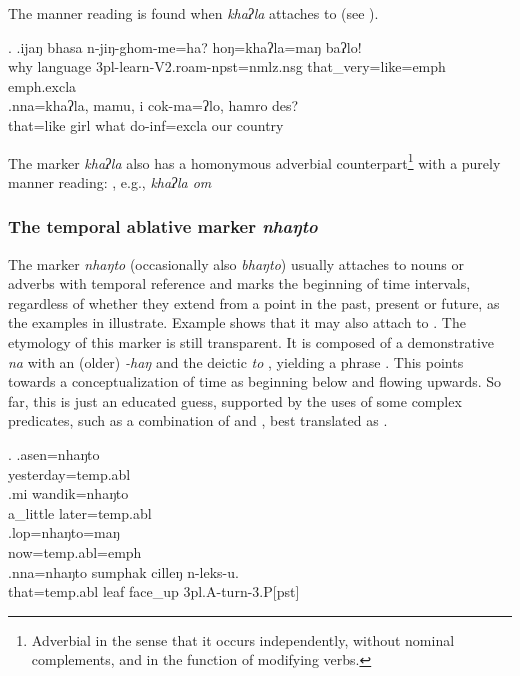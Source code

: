 \largerpage[2]
The manner reading is found when \emph{khaʔla}  attaches to  (see \Next).

\ex. \ag.ijaŋ bhasa    n-jiŋ-ghom-me=ha?                        hoŋ=khaʔla=maŋ baʔlo!\\
why language {\sc 3pl-}learn{\sc -V2.roam-npst=nmlz.nsg} that\_very=like{\sc =emph} {\sc emph.excla}\\
 
\bg.nna=khaʔla, mamu, i    cok-ma=ʔlo,               hamro des?\\
that=like girl what do{\sc -inf=excla} our country\\
 

The marker \emph{khaʔla} also has a homonymous adverbial counterpart\footnote{Adverbial in the sense that it occurs independently, without nominal complements, and in the function of  modifying verbs.} with a purely manner reading: , e.g.,  \emph{khaʔla om}  

\subsubsection{The temporal ablative marker \emph{nhaŋto} }
   
   The marker \emph{nhaŋto} (occasionally also \emph{bhaŋto}) usually attaches to nouns or adverbs with temporal reference and marks the beginning of time intervals, regardless of whether they extend from a point in the past, present or future, as the examples in \Next illustrate. Example \Next[d] shows that it may also attach to  . The etymology of this marker is still transparent. It is composed of a demonstrative \emph{na} with an (older)  \emph{-haŋ} and the deictic  \emph{to} , yielding a phrase . This points towards a conceptualization of time as beginning below and flowing upwards. So  far, this is just an educated guess, supported by the uses of some complex predicates, such as a combination of  and , best translated as .
 
 \ex. \ag.asen=nhaŋto\\
 yesterday{\sc =temp.abl}\\
 \bg.mi wandik=nhaŋto\\
 a\_little later{\sc =temp.abl}\\
   \bg.lop=nhaŋto=maŋ\\
   now{\sc =temp.abl=emph}\\
\bg.nna=nhaŋto sumphak cilleŋ              n-leks-u.\\
that{\sc =temp.abl} leaf face\_up {\sc 3pl.A-}turn{\sc -3.P[pst]}\\
  


